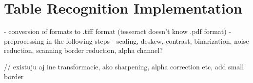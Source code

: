 \chapter{Table Recognition Implementation}

- conversion of formats to .tiff format (tesseract doesn't know .pdf format)
- preprocessing in the following steps - scaling, deskew, contrast, binarization, noise reduction, scanning border reduction, alpha channel?

// existuju aj ine transformacie, ako sharpening, alpha correction etc, add small border

